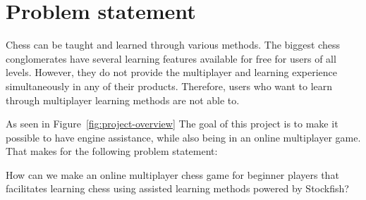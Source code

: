 \chapter{Problem statement}\label{ch:problem-statement}

Chess can be taught and learned through various methods.
The biggest chess conglomerates have several learning features available for free for users of all levels.
However, they do not provide the multiplayer and learning experience simultaneously in any of their products.
Therefore, users who want to learn through multiplayer learning methods are not able to.

As seen in Figure~\ref{fig:project-overview} The goal of this project is to make it possible to have engine
assistance, while also being in an online multiplayer game. That makes for the following problem statement:

\begin{tcolorbox}
    How can we make an online multiplayer chess game for beginner players that facilitates learning chess using
    assisted learning methods powered by Stockfish?
\end{tcolorbox}
